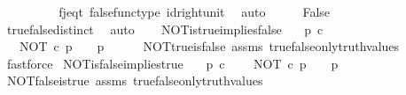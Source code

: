 \begin{isabellebody}
\ {\isachardoublequoteopen}{\isasymf}\ {\isacharequal}{\kern0pt}\ {\isasymt}{\isachardoublequoteclose}\isanewline
\ \ \ \ \isamarkupfalse%
\ f{\isacharunderscore}{\kern0pt}j{\isacharunderscore}{\kern0pt}eq{\isacharunderscore}{\kern0pt}t\ false{\isacharunderscore}{\kern0pt}func{\isacharunderscore}{\kern0pt}type\ id{\isacharunderscore}{\kern0pt}right{\isacharunderscore}{\kern0pt}unit{}\ \isamarkupfalse%
\ auto\isanewline
\ \ \isamarkupfalse%
\ \isamarkupfalse%
\ False\isanewline
\ \ \ \ \isamarkupfalse%
\ true{\isacharunderscore}{\kern0pt}false{\isacharunderscore}{\kern0pt}distinct\ \isamarkupfalse%
\ auto\isanewline
{}\isamarkupfalse%
%
\endisatagproof
{\isafoldproof}%
%
\isadelimproof
\isanewline
%
\endisadelimproof
\ \ \isanewline
{}\isamarkupfalse%
\ NOT{\isacharunderscore}{\kern0pt}is{\isacharunderscore}{\kern0pt}true{\isacharunderscore}{\kern0pt}implies{\isacharunderscore}{\kern0pt}false{\isacharcolon}{\kern0pt}\isanewline
\ \ \ {\isachardoublequoteopen}p\ {\isasymin}\isactrlsub c\ {\isasymOmega}{\isachardoublequoteclose}\isanewline
\ \ \ {\isachardoublequoteopen}NOT\ {\isasymcirc}\isactrlsub c\ p\ {\isacharequal}{\kern0pt}\ {\isasymt}\ {\isasymLongrightarrow}\ p\ {\isacharequal}{\kern0pt}\ {\isasymf}{\isachardoublequoteclose}\isanewline
%
\isadelimproof
\ \ %
\endisadelimproof
%
\isatagproof
{}\isamarkupfalse%
\ NOT{\isacharunderscore}{\kern0pt}true{\isacharunderscore}{\kern0pt}is{\isacharunderscore}{\kern0pt}false\ assms\ true{\isacharunderscore}{\kern0pt}false{\isacharunderscore}{\kern0pt}only{\isacharunderscore}{\kern0pt}truth{\isacharunderscore}{\kern0pt}values\ \isamarkupfalse%
\ fastforce%
\endisatagproof
{\isafoldproof}%
%
\isadelimproof
\isanewline
%
\endisadelimproof
\isanewline
{}\isamarkupfalse%
\ NOT{\isacharunderscore}{\kern0pt}is{\isacharunderscore}{\kern0pt}false{\isacharunderscore}{\kern0pt}implies{\isacharunderscore}{\kern0pt}true{\isacharcolon}{\kern0pt}\isanewline
\ \ \ {\isachardoublequoteopen}p\ {\isasymin}\isactrlsub c\ {\isasymOmega}{\isachardoublequoteclose}\isanewline
\ \ \ {\isachardoublequoteopen}NOT\ {\isasymcirc}\isactrlsub c\ p\ {\isacharequal}{\kern0pt}\ {\isasymf}\ {\isasymLongrightarrow}\ p\ {\isacharequal}{\kern0pt}\ {\isasymt}{\isachardoublequoteclose}\isanewline
%
\isadelimproof
\ \ %
\endisadelimproof
%
\isatagproof
{}\isamarkupfalse%
\ NOT{\isacharunderscore}{\kern0pt}false{\isacharunderscore}{\kern0pt}is{\isacharunderscore}{\kern0pt}true\ assms\ true{\isacharunderscore}{\kern0pt}false{\isacharunderscore}{\kern0pt}only{\isacharunderscore}{\kern0pt}truth{\isacharunderscore}{\kern0pt}values\ \isamarkupfalse%

\end{isabellebody}
